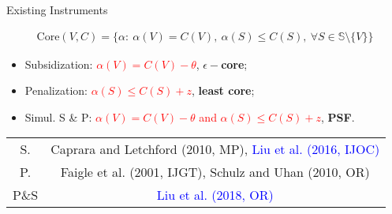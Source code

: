 \documentclass[14pt]{beamer}
\begin{document}
\begin{frame}{Existing Instruments}
\begin{small}
\vspace{-5mm}
\begin{eqnarray*}
\mathrm{Core}(V,C) = \bigg\{ \alpha:~ \alpha(V)=C(V),  ~\alpha(S) \leq C(S), ~\forall S \in \mathbb{S} \setminus \{V\}  \bigg\}
\end{eqnarray*}
\end{small}
\begin{itemize}
\small
\pause
\item Subsidization: \textcolor{red}{$\alpha(V)=C(V)-\theta$}, \textbf{$\epsilon-$core};
\pause
\item Penalization: \textcolor{red}{$\alpha(S) \leq C(S)+z$}, \textbf{least core};
\pause
\item Simul. S \& P: \textcolor{red}{$\alpha(V)=C(V)-\theta$ and $\alpha(S) \leq C(S)+z$}, \textbf{PSF}.
\end{itemize}
\pause
\vspace{-3mm}
\begin{table}[t]
	\small
	\centering
	\tabcolsep=10pt
	\renewcommand\arraystretch{1.8}
	\vspace{-3mm}
	\begin{tabular}[!h]{c c}
		\hline
		S.	&Caprara and Letchford (2010, MP), \textcolor{blue}{Liu et al. (2016, IJOC)}\\
		P.	&Faigle et al. (2001, IJGT), Schulz and Uhan (2010, OR)\\
		P\&S	&\textcolor{blue}{Liu et al. (2018, OR)}\\
		\hline
	\end{tabular}
	\vspace{-3mm}
\end{table}
\end{frame}
\end{document}
